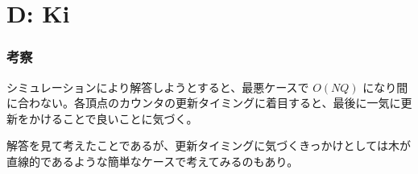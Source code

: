 \documentclass{jarticle}
\begin{document}
\section*{D: Ki}
\subsubsection*{考察}
シミュレーションにより解答しようとすると、最悪ケースで $O(NQ)$ になり間に合わない。各頂点のカウンタの更新タイミングに着目すると、最後に一気に更新をかけることで良いことに気づく。

解答を見て考えたことであるが、更新タイミングに気づくきっかけとしては木が直線的であるような簡単なケースで考えてみるのもあり。
\end{document}
